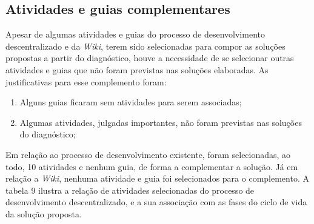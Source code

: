 \subsection{Atividades e guias complementares}

Apesar de algumas atividades e guias do processo de desenvolvimento descentralizado e da \textit{Wiki}, terem sido selecionadas para compor as soluções propostas a partir do diagnóstico, houve a necessidade de se selecionar outras atividades e guias que não foram previstas nas soluções elaboradas. As justificativas para esse complemento foram:

\begin{enumerate}
\item Alguns guias ficaram sem atividades para serem associadas;
\item Algumas atividades, julgadas importantes, não foram previstas nas soluções do diagnóstico;
\end{enumerate}

Em relação ao processo de desenvolvimento existente, foram selecionadas, ao todo, 10 atividades e nenhum guia, de forma a complementar a solução. Já em relação a \textit{Wiki}, nenhuma atividade e guia foi selecionados para o complemento. A tabela 9 ilustra a relação de atividades selecionadas do processo de desenvolvimento descentralizado, e a sua associação com as fases do ciclo de vida da solução proposta.


